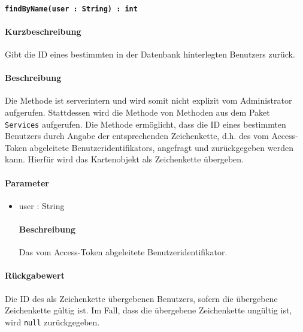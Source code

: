 \paragraph{\texttt{findByName(user : String) : int}}%
\paragraph*{Kurzbeschreibung}
Gibt die ID eines bestimmten in der Datenbank hinterlegten Benutzers zurück.
\paragraph*{Beschreibung}
Die Methode ist serverintern und wird somit nicht explizit vom Administrator aufgerufen.
Stattdessen wird die Methode von Methoden aus dem Paket \texttt{Services} aufgerufen.
Die Methode ermöglicht, dass die ID eines bestimmten Benutzers durch Angabe der entsprechenden Zeichenkette, d.h. des vom Access-Token abgeleitete Benutzeridentifikators, angefragt und zurückgegeben werden kann.
Hierfür wird das Kartenobjekt als Zeichenkette übergeben.
\paragraph*{Parameter}
\begin{itemize}
    \item user : String
    		\paragraph*{Beschreibung}
    		Das vom Access-Token abgeleitete Benutzeridentifikator.
\end{itemize}
\paragraph*{Rückgabewert}
Die ID des als Zeichenkette übergebenen Benutzers, sofern die übergebene Zeichenkette gültig ist.
Im Fall, dass die übergebene Zeichenkette ungültig ist, wird \texttt{null} zurückgegeben.
